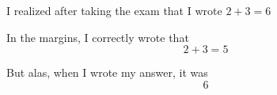 \documentclass{article}
\begin{document}
I realized after taking the exam that I wrote $2 + 3 = 6$

In the margins, I correctly wrote that $$2 + 3 = 5$$

But alas, when I wrote my answer, it was 
\[
6
\]
\end{document}
